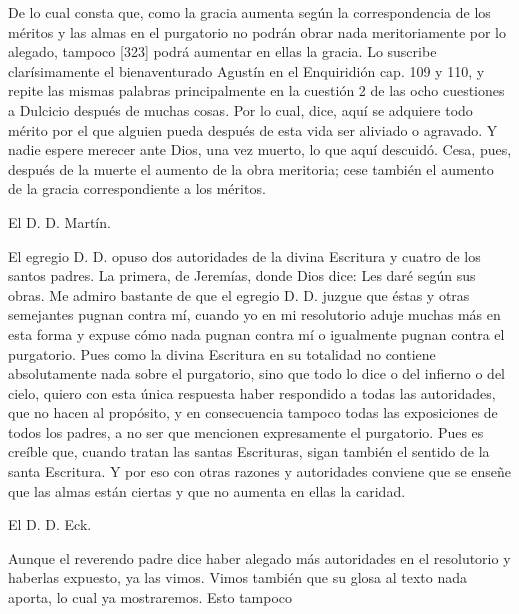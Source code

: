 De lo cual consta que, como la gracia aumenta según la correspondencia de los méritos y las almas en el purgatorio no podrán obrar nada meritoriamente por lo alegado, tampoco [323] podrá aumentar en ellas la gracia. Lo suscribe clarísimamente el bienaventurado Agustín en el Enquiridión cap. 109 y 110, y repite las mismas palabras principalmente en la cuestión 2 de las ocho cuestiones a Dulcicio después de muchas cosas. Por lo cual, dice, aquí se adquiere todo mérito por el que alguien pueda después de esta vida ser aliviado o agravado. Y nadie espere merecer ante Dios, una vez muerto, lo que aquí descuidó. Cesa, pues, después de la muerte el aumento de la obra meritoria; cese también el aumento de la gracia correspondiente a los méritos.

El D. D. Martín.

El egregio D. D. opuso dos autoridades de la divina Escritura y cuatro de los santos padres. La primera, de Jeremías, donde Dios dice: Les daré según sus obras. Me admiro bastante de que el egregio D. D. juzgue que éstas y otras semejantes pugnan contra mí, cuando yo en mi resolutorio aduje muchas más en esta forma y expuse cómo nada pugnan contra mí o igualmente pugnan contra el purgatorio. Pues como la divina Escritura en su totalidad no contiene absolutamente nada sobre el purgatorio, sino que todo lo dice o del infierno o del cielo, quiero con esta única respuesta haber respondido a todas las autoridades, que no hacen al propósito, y en consecuencia tampoco todas las exposiciones de todos los padres, a no ser que mencionen expresamente el purgatorio. Pues es creíble que, cuando tratan las santas Escrituras, sigan también el sentido de la santa Escritura. Y por eso con otras razones y autoridades conviene que se enseñe que las almas están ciertas y que no aumenta en ellas la caridad.

El D. D. Eck.

Aunque el reverendo padre dice haber alegado más autoridades en el resolutorio y haberlas expuesto, ya las vimos. Vimos también que su glosa al texto nada aporta, lo cual ya mostraremos. Esto tampoco

